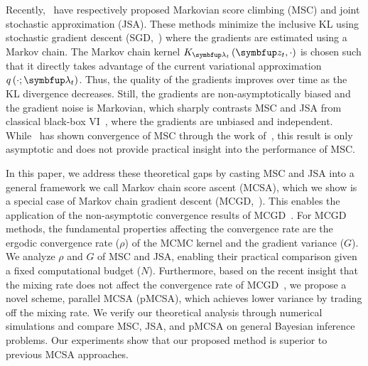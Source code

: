 Recently,~\citet{NEURIPS2020_b2070693,pmlr-v124-ou20a} have respectively proposed Markovian score climbing (MSC) and joint stochastic approximation (JSA).
These methods minimize the inclusive KL using stochastic gradient descent (SGD,~\citealt{robbins_stochastic_1951}) where the gradients are estimated using a Markov chain.
The Markov chain kernel \(K_{\vlambda_t}\left(\vz_t, \cdot\right)\) is chosen such that it directly takes advantage of the current variational approximation \(q\left(\cdot; \vlambda_t\right)\).
Thus, the quality of the gradients improves over time as the KL divergence decreases.
Still, the gradients are non-asymptotically biased and the gradient noise is Markovian, which sharply contrasts MSC and JSA from classical black-box VI~\citep{pmlr-v33-ranganath14, JMLR:v18:16-107}, where the gradients are unbiased and independent.
While~\citet{NEURIPS2020_b2070693} has shown convergence of MSC through the work of~\citet{gu_stochastic_1998}, this result is only asymptotic and does not provide practical insight into the performance of MSC.

%

In this paper, we address these theoretical gaps by casting MSC and JSA into a general framework we call Markov chain score ascent (MCSA), which we show is a special case of Markov chain gradient descent (MCGD,~\citealt{duchi_ergodic_2012}).
This enables the application of the non-asymptotic convergence results of MCGD~\citep{duchi_ergodic_2012, NEURIPS2018_1371bcce, pmlr-v99-karimi19a, doan_finitetime_2020, doan_convergence_2020, Xiong_Xu_Liang_Zhang_2021, debavelaere_convergence_2021}.
For MCGD methods, the fundamental properties affecting the convergence rate are the ergodic convergence rate (\(\rho\)) of the MCMC kernel and the gradient variance (\(G\)).
We analyze \(\rho\) and \(G\) of MSC and JSA, enabling their practical comparison given a fixed computational budget (\(N\)).
Furthermore, based on the recent insight that the mixing rate does not affect the convergence rate of MCGD~\citet{doan_convergence_2020,doan_finitetime_2020}, we propose a novel scheme, parallel MCSA (pMCSA), which achieves lower variance by trading off the mixing rate.
We verify our theoretical analysis through numerical simulations and compare MSC, JSA, and pMCSA on general Bayesian inference problems.
Our experiments show that our proposed method is superior to previous MCSA approaches.

